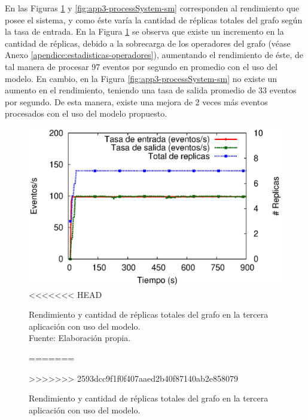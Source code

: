 En las Figuras \ref{fig:app3-processSystem-cm} y \ref{fig:app3-processSystem-sm} \normalsize{corresponden al rendimiento que posee el sistema, y como \'este var\'ia la cantidad de r\'eplicas totales del grafo seg\'un la tasa de entrada.} En la Figura \ref{fig:app3-processSystem-cm} \normalsize{se observa que existe un incremento en la cantidad de r\'eplicas, debido a la sobrecarga de los operadores del grafo} (v\'ease Anexo \ref{apendice:estadisticas-operadores}), \normalsize{aumentando el rendimiento de \'este, de tal manera de procesar 97 eventos por segundo en promedio con el uso del modelo. En cambio, en la Figura} \ref{fig:app3-processSystem-sm} \normalsize{no existe un aumento en el rendimiento, teniendo una tasa de salida promedio de 33 eventos por segundo. De esta manera, existe una mejora de 2 veces m\'as eventos procesados con el uso del modelo propuesto.}

\begin{figure}[!ht]
	\centering
	\captionsetup{justification=centering}
	\includegraphics[scale=0.7]{images/exp/app3/cm/logical/processSystem.eps}
<<<<<<< HEAD
    \caption[Rendimiento y cantidad de réplicas totales del grafo en la tercera aplicación con uso del modelo.]{Rendimiento y cantidad de réplicas totales del grafo en la tercera aplicación con uso del modelo.\\Fuente: Elaboración propia.}
=======
    \caption{Rendimiento y cantidad de r\'eplicas totales del grafo en la tercera aplicaci\'on con uso del modelo.}
>>>>>>> 2593dcc9f1f0f407aaed2b40f87140ab2e858079
	\label{fig:app3-processSystem-cm}
\end{figure}

